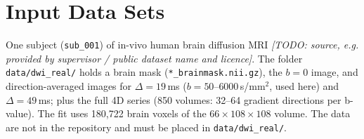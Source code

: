 \documentclass[11pt]{article}
\begin{document}
\section{Input Data Sets}

One subject (\texttt{sub\_001}) of in-vivo human brain diffusion MRI
\textit{[TODO: source, e.g. provided by supervisor / public dataset name and licence]}.
The folder \texttt{data/dwi\_real/} holds a brain mask (\texttt{*\_brainmask.nii.gz}), the $b=0$ image, and
direction-averaged images for $\Delta = 19$\,ms ($b = 50$--$6000$\,s/mm$^2$, used here) and
$\Delta = 49$\,ms; plus the full 4D series (850 volumes: 32--64 gradient directions per b-value).
The fit uses 180,722 brain voxels of the $66 \times 108 \times 108$ volume. The data are not in
the repository and must be placed in \texttt{data/dwi\_real/}.
\end{document}
